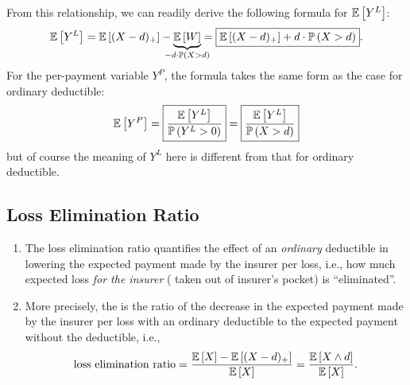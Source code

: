 \begin{enumerate}
From this relationship, we can readily derive the following formula for
\(\mathbb{E}\left[Y^L\right]\):
\[
\expv{Y^L}=\expv{(X-d)_+}-\underbrace{\expv{W}}_{\mathclap{-d\cdot\prob{X>d}}}
=\boxed{\expv{(X-d)_+}+d\cdot\prob{X>d}}.
\]
For the per-payment variable \(Y^P\), the formula takes the same form as the
case for ordinary deductible:
\[
\mathbb{E}\left[Y^P\right]=\boxed{\frac{\mathbb{E}\left[Y^L\right]}{\mathbb{P}\left(Y^L>0\right)}}
=\boxed{\frac{\mathbb{E}\left[Y^L\right]}{\mathbb{P}\left(X>d\right)}}
\]
but of course the meaning of \(Y^L\) here is different from that for ordinary
deductible.
\end{enumerate}
\subsection{Loss Elimination Ratio}
\begin{enumerate}
\item The loss elimination ratio quantifies the effect of an \emph{ordinary}
deductible in lowering the expected payment  made by the
insurer  per loss, i.e., how much expected loss \emph{for the
insurer} ( taken out of insurer's pocket) is
``eliminated''.

\item More precisely, the  is the ratio of the
decrease  in the expected payment  made
by the insurer  per loss with an ordinary deductible to the
expected payment without the deductible, i.e.,
\[
\text{loss elimination ratio}=\frac{\mathbb{E}\left[X\right]-\mathbb{E}\left[(X-d)_{+}\right]}{\mathbb{E}\left[X\right]}
=\frac{\mathbb{E}\left[X\wedge d\right]}{\mathbb{E}\left[X\right]}.
\]
\end{enumerate}
